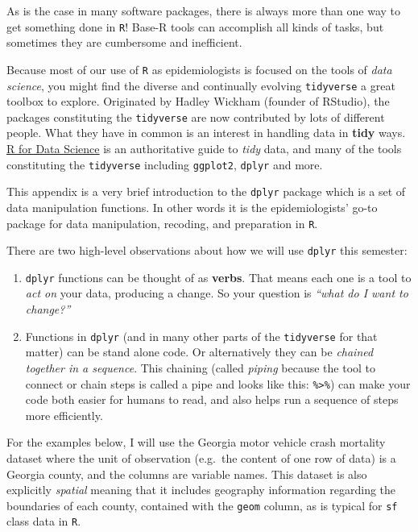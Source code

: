 \documentclass[
]{book}
\providecommand{\tightlist}{%
  \setlength{\itemsep}{0pt}\setlength{\parskip}{0pt}}
\begin{document}
As is the case in many software packages, there is always more than one way to get something done in \texttt{R}! Base-R tools can accomplish all kinds of tasks, but sometimes they are cumbersome and inefficient.

Because most of our use of \texttt{R} as epidemiologists is focused on the tools of \emph{data science}, you might find the diverse and continually evolving \texttt{tidyverse} a great toolbox to explore. Originated by Hadley Wickham (founder of RStudio), the packages constituting the \texttt{tidyverse} are now contributed by lots of different people. What they have in common is an interest in handling data in \textbf{tidy} ways. \href{https://r4ds.had.co.nz/}{R for Data Science} is an authoritative guide to \emph{tidy} data, and many of the tools constituting the \texttt{tidyverse} including \texttt{ggplot2}, \texttt{dplyr} and more.

This appendix is a very brief introduction to the \texttt{dplyr} package which is a set of data manipulation functions. In other words it is the epidemiologists' go-to package for data manipulation, recoding, and preparation in \texttt{R}.

There are two high-level observations about how we will use \texttt{dplyr} this semester:

\begin{enumerate}
\def\labelenumi{\arabic{enumi}.}
\tightlist
\item
  \texttt{dplyr} functions can be thought of as \textbf{verbs}. That means each one is a tool to \emph{act on} your data, producing a change. So your question is \emph{``what do I want to change?''}
\item
  Functions in \texttt{dplyr} (and in many other parts of the \texttt{tidyverse} for that matter) can be stand alone code. Or alternatively they can be \emph{chained together in a sequence}. This chaining (called \emph{piping} because the tool to connect or chain steps is called a pipe and looks like this: \texttt{\%\textgreater{}\%}) can make your code both easier for humans to read, and also helps run a sequence of steps more efficiently.
\end{enumerate}

For the examples below, I will use the Georgia motor vehicle crash mortality dataset where the unit of observation (e.g.~the content of one row of data) is a Georgia county, and the columns are variable names. This dataset is also explicitly \emph{spatial} meaning that it includes geography information regarding the boundaries of each county, contained with the \texttt{geom} column, as is typical for \texttt{sf} class data in \texttt{R}.
\end{document}
